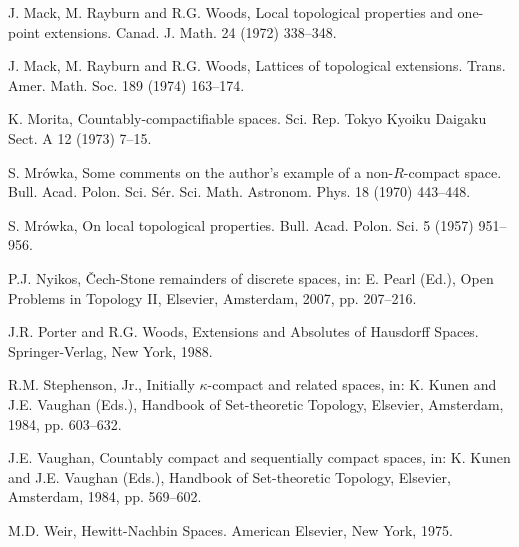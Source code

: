 \documentclass{amsart}
\theoremstyle{definition}
\theoremstyle{remark}
\theoremstyle{notation}
\numberwithin{equation}{section}
\begin{document}
\begin{thebibliography}{10}
 J. Mack, M. Rayburn and R.G.  Woods, Local topological properties and one-point extensions. Canad. J. Math. 24 (1972) 338--348.

 J. Mack, M. Rayburn and R.G.  Woods,  Lattices of topological extensions. Trans. Amer. Math. Soc. 189 (1974) 163--174.

 K. Morita, Countably-compactifiable spaces. Sci. Rep. Tokyo Kyoiku Daigaku Sect. A 12 (1973) 7--15.

  S. Mr\'{o}wka, Some comments on the author's example of a non-$R$-compact space. Bull. Acad. Polon. Sci. S\'{e}r. Sci. Math. Astronom. Phys. 18 (1970) 443--448.

 S. Mr\'{o}wka, On local topological properties. Bull. Acad. Polon. Sci. 5 (1957) 951--956.

 P.J. Nyikos, \v{C}ech-Stone remainders of discrete spaces, in: E. Pearl (Ed.), Open Problems in Topology II,  Elsevier,  Amsterdam, 2007, pp. 207--216.

 J.R. Porter and R.G. Woods, Extensions and Absolutes of Hausdorff Spaces. Springer-Verlag, New York, 1988.

 R.M. Stephenson, Jr., Initially $\kappa$-compact and related spaces, in: K. Kunen and J.E. Vaughan (Eds.), Handbook of Set-theoretic Topology, Elsevier, Amsterdam, 1984, pp. 603--632.

 J.E. Vaughan, Countably compact and sequentially compact spaces, in: K. Kunen and J.E. Vaughan (Eds.), Handbook of Set-theoretic Topology,  Elsevier,  Amsterdam, 1984, pp. 569--602.

 M.D. Weir,  Hewitt-Nachbin Spaces. American Elsevier, New York, 1975.

\end{thebibliography}
\end{document}
